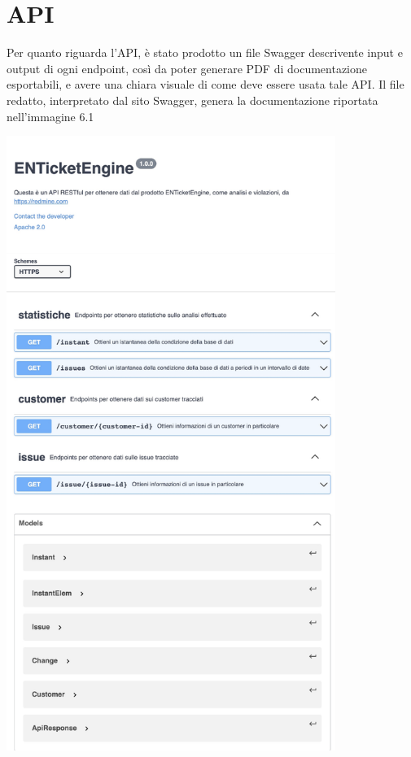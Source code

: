 	\section{API}
		Per quanto riguarda l'API, è stato prodotto un file Swagger descrivente input e output di ogni endpoint, così da poter generare PDF di documentazione esportabili, e avere una chiara visuale di come deve essere usata tale API.
		Il file redatto, interpretato dal sito Swagger, genera la documentazione riportata nell'immagine 6.1
		\begin{center}
			\includegraphics[keepaspectratio = true, height=20cm]{immagini/swagger.png}
		\end{center}